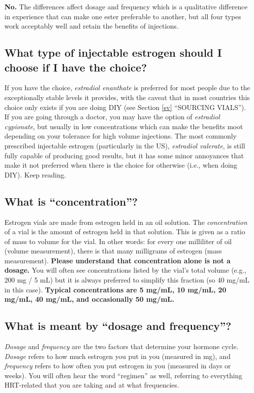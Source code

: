 \documentclass{article}
\begin{document}
\textbf{No.} The differences affect dosage and frequency which is a qualitative difference in experience that can make one ester preferable to another, but all four types work acceptably well and retain the benefits of injections.

\subsection{What type of injectable estrogen should I choose if I have the choice?}

If you have the choice, \textit{estradiol enanthate} is preferred for most people due to the exceptionally stable levels it provides, with the caveat that in most countries this choice only exists if you are doing DIY (see Section \ref{sv} “SOURCING VIALS”). If you are going through a doctor, you may have the option of \textit{estradiol cypionate}, but usually in low concentrations which can make the benefits moot depending on your tolerance for high volume injections. The most commonly prescribed injectable estrogen (particularly in the US), \textit{estradiol valerate}, is still fully capable of producing good results, but it has some minor annoyances that make it not preferred when there is the choice for otherwise (i.e., when doing DIY). Keep reading.

\subsection{What is “concentration”?}

Estrogen vials are made from estrogen held in an oil solution. The \textit{concentration} of a vial is the amount of estrogen held in that solution. This is given as a ratio of mass to volume for the vial. In other words: for every one milliliter of oil (volume measurement), there is that many milligrams of estrogen (mass measurement). \textbf{Please understand that concentration alone is not a dosage.} You will often see concentrations listed by the vial’s total volume (e.g., 200 mg / 5 mL) but it is always preferred to simplify this fraction (so 40 mg/mL in this case). \textbf{Typical concentrations are 5 mg/mL, 10 mg/mL, 20 mg/mL, 40 mg/mL, and occasionally 50 mg/mL.}

\subsection{What is meant by “dosage and frequency”?}

\textit{Dosage} and \textit{frequency} are the two factors that determine your hormone cycle. \textit{Dosage} refers to how much estrogen you put in you (measured in mg), and \textit{frequency} refers to how often you put estrogen in you (measured in days or weeks). You will often hear the word “regimen” as well, referring to everything HRT-related that you are taking and at what frequencies.
\end{document}
